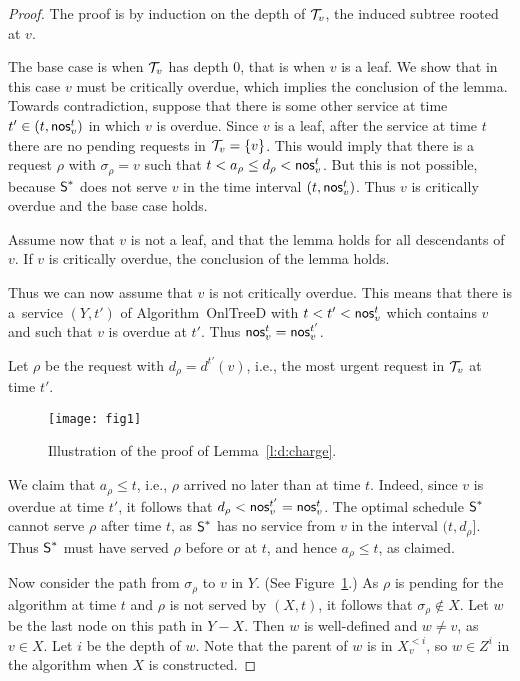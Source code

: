 \documentclass[a4paper]{article}
\newcommand{\calT}{{\cal T}}
\newcommand{\braced}[1]{{ \left\{ #1 \right\} }}
\newcommand{\OnAlgTreesDeadlines}{{\sc OnlTreeD}}
\newcommand{\optschedS}{\mbox{\rm\textsf{S}}^\ast}
\newcommand{\trignode}{\sigma}
\newcommand{\advtrans}{\mbox{\rm\textsf{nos}}}
\begin{document}
\begin{proof}
The proof is by induction on the depth of $\calT_v$, the induced
subtree rooted at $v$. 

The base case is when $\calT_v$ has depth $0$, that is when $v$ is a
leaf.  We show that in this case $v$ must be critically overdue, which
implies the conclusion of the lemma.  Towards contradiction, suppose
that there is some other service at time $t'\in (t , \advtrans^t_v)$
in which $v$ is overdue.  Since $v$ is a leaf, after the service at
time $t$ there are no pending requests in $\calT_v =\braced{v}$.  This
would imply that there is a request $\rho$ with $\trignode_\rho = v$
such that $t < a_\rho \le d_\rho < \advtrans^t_v$.  But this is not
possible, because $\optschedS$ does not serve $v$ in the time
interval $(t,\advtrans^t_v)$.  Thus $v$ is critically overdue and the
base case holds.

Assume now that $v$ is not a leaf, and that the lemma holds for all
descendants of $v$.  If $v$ is critically overdue, the conclusion of
the lemma holds.

Thus we can now assume that $v$ is not critically overdue. This means
that there is a~service $(Y,t')$ of Algorithm~{\OnAlgTreesDeadlines}
with $t<t'<\advtrans^t_v$ which contains $v$ and such that $v$ is
overdue at $t'$.  Thus $\advtrans^t_v=\advtrans^{t'}_v$.

Let $\rho$ be the request with $d_\rho=d^{t'}(v)$, i.e., the most
urgent request in $\calT_v$ at time $t'$.


\begin{figure}
\begin{center}
\texttt{[image: fig1]}
\caption{Illustration of the proof of Lemma~\ref{l:d:charge}.}
\label{fig: online mlapd analysis}
\end{center}
\end{figure}

We claim that $a_\rho \leq t$, i.e., $\rho$ arrived no later than
at time $t$. Indeed, since $v$ is overdue at time $t'$, it follows
that $d_\rho < \advtrans^{t'}_v=\advtrans^t_v$.  The optimal schedule
$\optschedS$ cannot serve $\rho$ after time $t$, as $\optschedS$ has no
service from $v$ in the interval $(t,d_\rho]$. Thus $\optschedS$ must
have served $\rho$ before or at $t$, and hence $a_\rho \le t$, as
claimed.

Now consider the path from $\trignode_\rho$ to $v$ in $Y$.  (See
Figure~\ref{fig: online mlapd analysis}.)  As $\rho$ is pending
for the algorithm at time $t$ and $\rho$ is not served by $(X,t)$,
it follows that $\trignode_\rho\not\in X$.  Let $w$ be the last node
on this path in $Y-X$. Then $w$ is well-defined and $w\neq v$, as
$v\in X$. Let $i$ be the depth of $w$.  Note that the parent of $w$ is
in $X^{<i}_v$, so $w\in Z^i$ in the algorithm when $X$ is constructed.


\end{proof}
\end{document}
